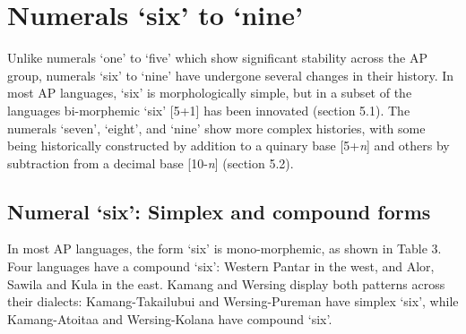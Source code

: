 {\section{Numerals `six' to `nine'}
Unlike numerals `one' to `five' which show significant stability across the AP group, numerals `six' to `nine' have undergone several changes in their history. In most AP languages, `six' is morphologically simple, but in a subset of the languages bi-morphemic `six' [5+1] has been innovated (section 5.1). The numerals `seven', `eight', and `nine' show more complex histories, with some being historically constructed by addition to a quinary base [5+\textit{n}] and others by subtraction from a decimal base [10-\textit{n}] (section 5.2).

\subsection{Numeral `six': Simplex and compound forms}
In most AP languages, the form `six' is mono-morphemic, as shown in Table 3. Four languages have a compound `six': Western Pantar in the west, and Alor, Sawila and Kula in the east. Kamang and Wersing display both patterns across their dialects: Kamang-Takailubui and Wersing-Pureman have simplex `six', while Kamang-Atoitaa and Wersing-Kolana have compound `six'.



\begin{table}



\end{table}}
